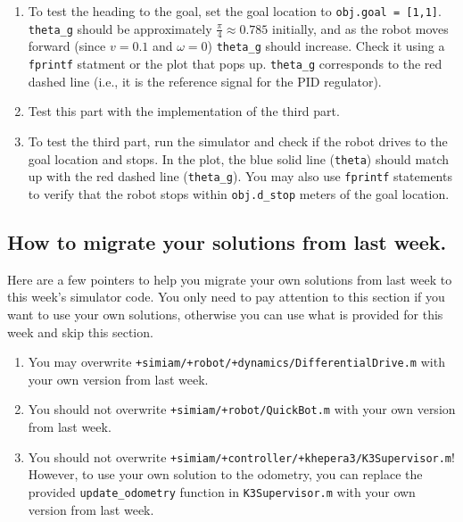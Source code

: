 \documentclass[10pt]{article}
\begin{document}
\begin{enumerate}
  \item To test the heading to the goal, set the goal location to \texttt{obj.goal = [1,1]}. \texttt{theta\_g} should be approximately $\frac{\pi}{4} \approx 0.785$ initially, and as the robot moves forward (since $v=0.1$ and $\omega=0$) \texttt{theta\_g} should increase. Check it using a \texttt{fprintf} statment or the plot that pops up. \texttt{theta\_g} corresponds to the red dashed line (i.e., it is the reference signal for the PID regulator).
  \item Test this part with the implementation of the third part.
  \item To test the third part, run the simulator and check if the robot drives to the goal location and stops. In the plot, the blue solid line (\texttt{theta}) should match up with the red dashed line (\texttt{theta\_g}). You may also use \texttt{fprintf} statements to verify that the robot stops within \texttt{obj.d\_stop} meters of the goal location.
\end{enumerate}

\subsection*{How to migrate your solutions from last week.}

Here are a few pointers to help you migrate your own solutions from last week to this week's simulator code. You only need to pay attention to this section if you want to use your own solutions, otherwise you can use what is provided for this week and skip this section.

\begin{enumerate}
 \item You may overwrite \texttt{+simiam/+robot/+dynamics/DifferentialDrive.m} with your own version from last week.
 \item You should not overwrite \texttt{+simiam/+robot/QuickBot.m} with your own version from last week.
 \item You should not overwrite \texttt{+simiam/+controller/+khepera3/K3Supervisor.m}! However, to use your own solution to the odometry, you can replace the provided \texttt{update\_odometry} function in \texttt{K3Supervisor.m} with your own version from last week.
\end{enumerate}
\end{document}
